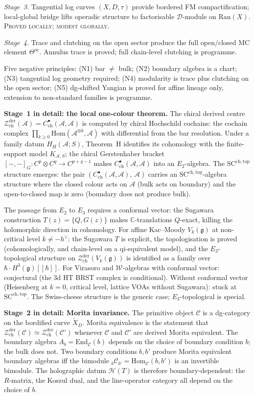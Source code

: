 \documentclass[11pt,reqno]{amsart}
\theoremstyle{definition}
\theoremstyle{remark}
\providecommand{\cA}{\mathcal{A}}
\providecommand{\cC}{\mathcal{C}}
\providecommand{\cD}{\mathcal{D}}
\providecommand{\cH}{\mathcal{H}}
\providecommand{\cW}{\mathcal{W}}
\providecommand{\cZ}{\mathcal{Z}}
\providecommand{\Ran}{\mathrm{Ran}}
\providecommand{\Hom}{\mathrm{Hom}}
\providecommand{\fg}{\mathfrak{g}}
\providecommand{\bC}{\mathbb{C}}
\providecommand{\SCchtop}{\mathrm{SC}^{\mathrm{ch,top}}}
\providecommand{\End}{\mathrm{End}}
\providecommand{\der}{\mathrm{der}}
\providecommand{\ch}{\mathrm{ch}}
\providecommand{\oc}{\mathrm{oc}}
\numberwithin{equation}{section}
\begin{document}
\emph{Stage~3.} Tangential log curves $(X, D, \tau)$ provide
bordered FM compactification; local-global bridge lifts
operadic structure to factorisable $\cD$-module on $\Ran(X)$.
\textsc{Proved locally; modest globally.}

\emph{Stage~4.} Trace and clutching on the open sector produce
the full open/closed MC element $\Theta^{\oc}$. Annulus trace
is proved; full chain-level clutching is programme.

Five negative principles: (N1) bar $\neq$ bulk; (N2) boundary
algebra is a chart; (N3) tangential log geometry required;
(N4) modularity is trace plus clutching on the open sector;
(N5) dg-shifted Yangian is proved for affine lineage only,
extension to non-standard families is programme.

\medskip\noindent\textbf{Stage~1 in detail: the local one-colour
theorem.}\enspace
The chiral derived centre
$\cZ^{\der}_{\ch}(\cA) = C^\bullet_{\ch}(\cA, \cA)$ is computed
by chiral Hochschild cochains: the cochain complex
$\prod_{k \ge 0} \Hom(\cA^{\otimes k}, \cA)$ with differential
from the bar resolution. Under a family datum \(H_H(\cA;S)\),
Theorem~H identifies its cohomology with the finite-support model
\(K_{\cA,S}\); the chiral Gerstenhaber bracket
$[-,-]_G \colon C^p \otimes C^q \to C^{p+q-1}$ makes
$C^\bullet_{\ch}(\cA, \cA)$ into an $E_2$-algebra. The
$\SCchtop$ structure emerges: the pair
$(C^\bullet_{\ch}(\cA, \cA),\, \cA)$ carries an
$\SCchtop$-algebra structure where the closed colour acts on
$\cA$ (bulk acts on boundary) and the open-to-closed map is
zero (boundary does not produce bulk).

The passage from $E_2$ to $E_3$ requires a conformal vector:
the Sugawara construction $T(z) = \{Q, G(z)\}$ makes
$\bC$-translations $Q$-exact, killing the holomorphic direction
in cohomology. For affine Kac--Moody $V_k(\fg)$ at non-critical
level $k \neq -h^\vee$: the Sugawara $T$ is explicit, the
topologisation is proved (cohomologically, and chain-level
on a qi-equivalent model), and the $E_3$-topological structure on
$\cZ^{\der}_{\ch}(V_k(\fg))$ is identified as a family over
$\hbar \cdot H^3(\fg)[[\hbar]]$. For Virasoro and $\cW$-algebras
with conformal vector: conjectural (the 3d HT BRST complex is
conditional). Without conformal vector (Heisenberg at $k = 0$,
critical level, lattice VOAs without Sugawara): stuck at
$\SCchtop$. The Swiss-cheese structure is the generic case;
$E_3$-topological is special.

\medskip\noindent\textbf{Stage~2 in detail: Morita invariance.}\enspace
The primitive object $\cC$ is a dg-category on the bordified
curve $\widetilde X_D$. Morita equivalence is the statement
that $\cZ^{\der}_{\ch}(\cC) \simeq
\cZ^{\der}_{\ch}(\cC')$ whenever $\cC$ and $\cC'$ are derived
Morita equivalent. The boundary algebra $A_b = \End_\cC(b)$
depends on the choice of boundary condition $b$; the bulk does
not. Two boundary conditions $b, b'$ produce Morita equivalent
boundary algebras iff the bimodule
${}_b\cC_{b'} = \Hom_\cC(b, b')$ is an invertible bimodule.
The holographic datum $\cH(T)$ is therefore boundary-dependent:
the $R$-matrix, the Koszul dual, and the line-operator category
all depend on the choice of $b$.
\end{document}
